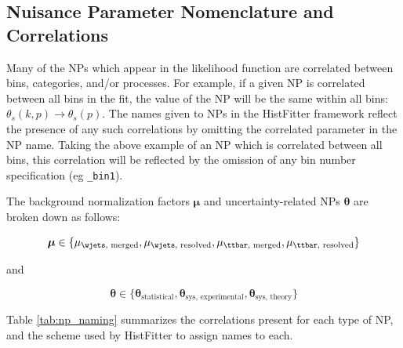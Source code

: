 \subsection{Nuisance Parameter Nomenclature and Correlations}

Many of the NPs which appear in the likelihood function are correlated between bins, categories, and/or processes. For example, if a given NP is correlated between all bins in the fit, the value of the NP will be the same within all bins: \(\theta_s(k, p) \rightarrow \theta_s(p)\). The names given to NPs in the HistFitter framework reflect the presence of any such correlations by omitting the correlated parameter in the NP name. Taking the above example of an NP which is correlated between all bins, this correlation will be reflected by the omission of any bin number specification (eg \verb|_bin1|).

The background normalization factors \(\boldsymbol{\mu}\) and uncertainty-related NPs \(\boldsymbol{\theta}\) are broken down as follows:

\begin{equation}
\label{eq:norm_factor_breakdown}
\boldsymbol{\mu}\in\{\mu_\text{\wjets, merged}, \mu_\text{\wjets, resolved}, \mu_\text{\ttbar, merged}, \mu_\text{\ttbar, resolved}\}
\end{equation}

\noindent and

\begin{equation}
\label{eq:norm_factor_breakdown}
\boldsymbol{\theta}\in\{\boldsymbol{\theta}_\text{statistical}, \boldsymbol{\theta}_\text{sys, experimental}, \boldsymbol{\theta}_\text{sys, theory}\}
\end{equation}

Table \ref{tab:np_naming} summarizes the correlations present for each type of NP, and the scheme used by HistFitter to assign names to each.

